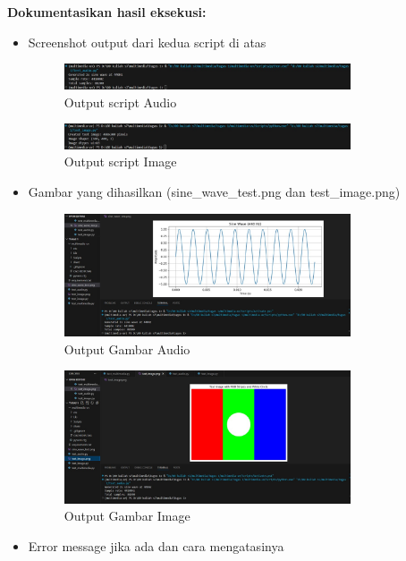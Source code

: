 \documentclass[11pt,a4paper]{article}
\begin{document}
\textbf{Dokumentasikan hasil eksekusi:}
\begin{itemize}
    \item Screenshot output dari kedua script di atas
    \begin{figure}[H]
        \centering
        \includegraphics[width=0.8\textwidth]{figure/ss8verif.jpg}
        \caption{Output script Audio}
    \end{figure}
    \begin{figure}[H]
        \centering
        \includegraphics[width=0.8\textwidth]{figure/ss9verif.jpg}
        \caption{Output script Image}
    \end{figure}
    \item Gambar yang dihasilkan (sine\_wave\_test.png dan test\_image.png)
    \begin{figure}[H]
        \centering
        \includegraphics[width=0.8\textwidth]{figure/sine_test.jpg}
        \caption{Output Gambar Audio}
    \end{figure}
    \begin{figure}[H]
        \centering
        \includegraphics[width=0.8\textwidth]{figure/image_test.jpg}
        \caption{Output Gambar Image}
    \end{figure}
    \item Error message jika ada dan cara mengatasinya
\end{itemize}
\end{document}
